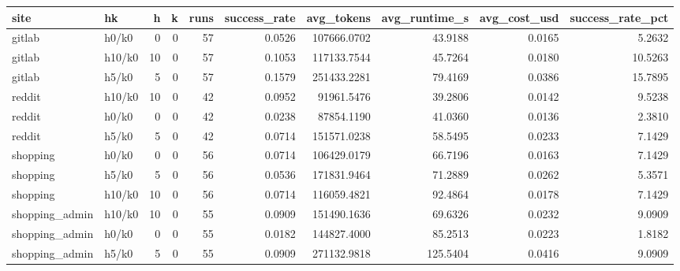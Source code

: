 \begin{tabular}{llrrrrrrrr}
\toprule
site & hk & h & k & runs & success_rate & avg_tokens & avg_runtime_s & avg_cost_usd & success_rate_pct \\
\midrule
gitlab & h0/k0 & 0 & 0 & 57 & 0.0526 & 107666.0702 & 43.9188 & 0.0165 & 5.2632 \\
gitlab & h10/k0 & 10 & 0 & 57 & 0.1053 & 117133.7544 & 45.7264 & 0.0180 & 10.5263 \\
gitlab & h5/k0 & 5 & 0 & 57 & 0.1579 & 251433.2281 & 79.4169 & 0.0386 & 15.7895 \\
reddit & h10/k0 & 10 & 0 & 42 & 0.0952 & 91961.5476 & 39.2806 & 0.0142 & 9.5238 \\
reddit & h0/k0 & 0 & 0 & 42 & 0.0238 & 87854.1190 & 41.0360 & 0.0136 & 2.3810 \\
reddit & h5/k0 & 5 & 0 & 42 & 0.0714 & 151571.0238 & 58.5495 & 0.0233 & 7.1429 \\
shopping & h0/k0 & 0 & 0 & 56 & 0.0714 & 106429.0179 & 66.7196 & 0.0163 & 7.1429 \\
shopping & h5/k0 & 5 & 0 & 56 & 0.0536 & 171831.9464 & 71.2889 & 0.0262 & 5.3571 \\
shopping & h10/k0 & 10 & 0 & 56 & 0.0714 & 116059.4821 & 92.4864 & 0.0178 & 7.1429 \\
shopping_admin & h10/k0 & 10 & 0 & 55 & 0.0909 & 151490.1636 & 69.6326 & 0.0232 & 9.0909 \\
shopping_admin & h0/k0 & 0 & 0 & 55 & 0.0182 & 144827.4000 & 85.2513 & 0.0223 & 1.8182 \\
shopping_admin & h5/k0 & 5 & 0 & 55 & 0.0909 & 271132.9818 & 125.5404 & 0.0416 & 9.0909 \\
\bottomrule
\end{tabular}
